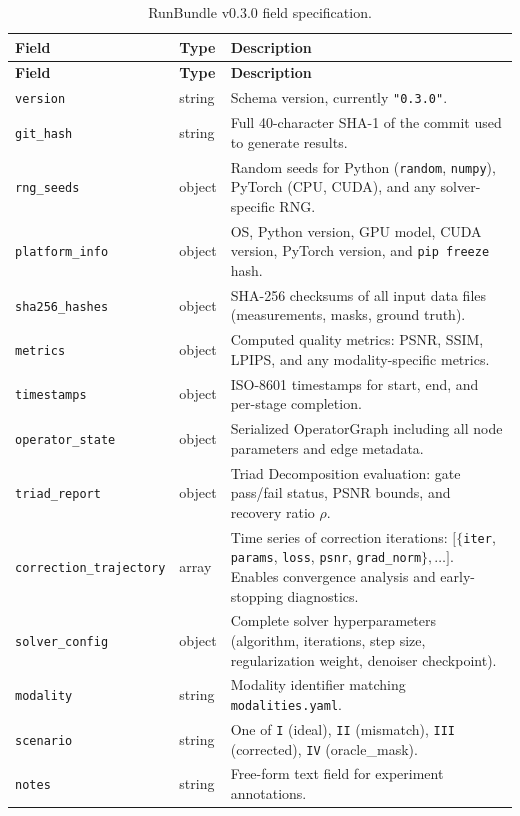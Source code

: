 \documentclass[11pt]{article}
\theoremstyle{definition}
\begin{document}
\begin{longtable}{l l p{7cm}}
\caption{RunBundle v0.3.0 field specification.}
\label{tab:runbundle} \\
\toprule
\textbf{Field} & \textbf{Type} & \textbf{Description} \\
\midrule
\endfirsthead
\toprule
\textbf{Field} & \textbf{Type} & \textbf{Description} \\
\midrule
\endhead
\bottomrule
\endlastfoot
\texttt{version}        & string   & Schema version, currently \texttt{"0.3.0"}. \\
\texttt{git\_hash}      & string   & Full 40-character SHA-1 of the commit used to generate results. \\
\texttt{rng\_seeds}     & object   & Random seeds for Python (\texttt{random}, \texttt{numpy}), PyTorch (CPU, CUDA), and any solver-specific RNG. \\
\texttt{platform\_info} & object   & OS, Python version, GPU model, CUDA version, PyTorch version, and \texttt{pip freeze} hash. \\
\texttt{sha256\_hashes} & object   & SHA-256 checksums of all input data files (measurements, masks, ground truth). \\
\texttt{metrics}        & object   & Computed quality metrics: PSNR, SSIM, LPIPS, and any modality-specific metrics. \\
\texttt{timestamps}     & object   & ISO-8601 timestamps for start, end, and per-stage completion. \\
\texttt{operator\_state}& object   & Serialized OperatorGraph including all node parameters and edge metadata. \\
\texttt{triad\_report}  & object   & Triad Decomposition evaluation: gate pass/fail status, PSNR bounds, and recovery ratio $\rho$. \\
\texttt{correction\_trajectory} & array &
  Time series of correction iterations: $[\{$\texttt{iter}, \texttt{params},
  \texttt{loss}, \texttt{psnr}, \texttt{grad\_norm}$\}, \ldots]$.
  Enables convergence analysis and early-stopping diagnostics. \\
\texttt{solver\_config} & object   & Complete solver hyperparameters (algorithm, iterations, step size, regularization weight, denoiser checkpoint). \\
\texttt{modality}       & string   & Modality identifier matching \texttt{modalities.yaml}. \\
\texttt{scenario}       & string   & One of \texttt{I} (ideal), \texttt{II} (mismatch), \texttt{III} (corrected), \texttt{IV} (oracle\_mask). \\
\texttt{notes}          & string   & Free-form text field for experiment annotations. \\
\end{longtable}
\end{document}
